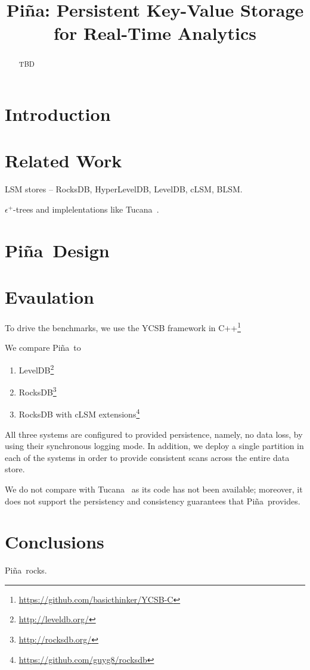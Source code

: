 \documentclass[10pt,preprint,numbers]{sigplanconf}
\date{}
\newcommand{\sys}{Pi\~na}
\begin{document}
\title{\sys: Persistent Key-Value Storage for Real-Time Analytics} 
\maketitle

\begin{abstract}

TBD

\end{abstract}

\section{Introduction}


\section{Related Work}
\label{sec:related}

LSM stores -- RocksDB, HyperLevelDB, LevelDB, cLSM, BLSM.

$\epsilon^+$-trees and implelentations like Tucana~\cite{tucana}.

\section{\sys\ Design}
\label{sec:design}



\section{Evaulation}
\label{sec:eval}

To drive the benchmarks, we use the 
YCSB framework in C++\footnote{\url{https://github.com/basicthinker/YCSB-C}}  

We compare \sys\ to 
\begin{enumerate}
\item
LevelDB\footnote{\url{http://leveldb.org/}}
\item
RocksDB\footnote{\url{http://rocksdb.org/}}
\item
RocksDB with cLSM extensions\footnote{\url{https://github.com/guyg8/rocksdb}}
\end{enumerate}
All three systems are configured to provided persistence, namely, no data loss, by using their synchronous logging mode.
In addition, we deploy a single partition in each of the systems in order to provide consistent scans across the entire data store.

We do not compare with Tucana~\cite{tucana} as its code has not been available; moreover, it does not support the persistency and consistency guarantees that \sys\ provides. 


\section{Conclusions}
\label{sec:conclusions}
\sys\ rocks.


 
\end{document}
